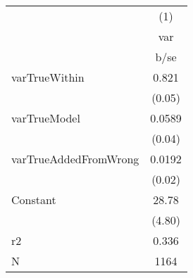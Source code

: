 {
\def\sym#1{\ifmmode^{#1}\else\(^{#1}\)\fi}
\begin{tabular}{l*{1}{c}}
\hline\hline
            &\multicolumn{1}{c}{(1)}\\
            &\multicolumn{1}{c}{var}\\
            &        b/se\\
\hline
varTrueWithin&       0.821\\
            &      (0.05)\\
varTrueModel&      0.0589\\
            &      (0.04)\\
varTrueAddedFromWrong&      0.0192\\
            &      (0.02)\\
Constant    &       28.78\\
            &      (4.80)\\
\hline
r2          &       0.336\\
N           &        1164\\
\hline\hline
\end{tabular}
}
